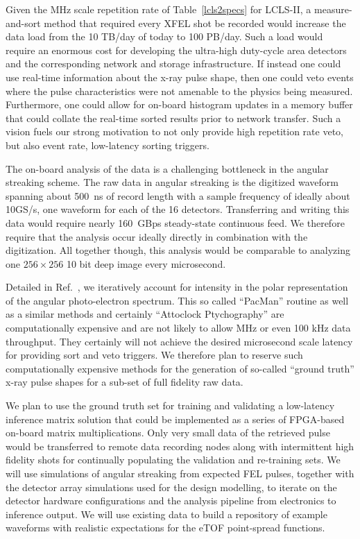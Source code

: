 Given the MHz scale repetition rate of Table~\ref{lcls2specs} for LCLS-II, a measure-and-sort method that required every XFEL shot be recorded would increase the data load from the 10 TB/day of today to 100 PB/day.
Such a load would require an enormous cost for developing the ultra-high duty-cycle area detectors and the corresponding network and storage infrastructure. 
If instead one could use real-time information about the x-ray pulse shape, then one could veto events where the pulse characteristics were not amenable to the physics being measured.
Furthermore, one could allow for on-board histogram updates in a memory buffer that could collate the real-time sorted results prior to network transfer.
Such a vision fuels our strong motivation to not only provide high repetition rate veto, but also event rate, low-latency sorting triggers.

The on-board analysis of the data is a challenging bottleneck in the angular streaking scheme.
The raw data in angular streaking is the digitized waveform spanning about 500~ns of record length with a sample frequency of ideally about 10GS/s, one waveform for each of the 16 detectors.
Transferring and writing this data would require nearly 160~GBps steady-state continuous feed.
We therefore require that the analysis occur ideally directly in combination with the digitization.
All together though, this analysis would be comparable to analyzing one $256\times256$ 10 bit deep image every microsecond.

Detailed in Ref.~\cite{Nick2018}, we iteratively account for intensity in the polar representation of the angular photo-electron spectrum.
This so called ``PacMan'' routine as well as a similar methods \cite{Thomas2015,Siqi2018,Worner2018} and certainly ``Attoclock Ptychography'' \cite{Feurer2018} are computationally expensive and are not likely to allow MHz or even 100 kHz data throughput.
They certainly will not achieve the desired microsecond scale latency for providing sort and veto triggers.
We therefore plan to reserve such computationally expensive methods for the generation of so-called ``ground truth'' x-ray pulse shapes for a sub-set of full fidelity raw data.

We plan to use the ground truth set for training and validating a low-latency inference matrix solution that could be implemented as a series of FPGA-based on-board matrix multiplications.
Only very small data of the retrieved pulse would be transferred to remote data recording nodes along with intermittent high fidelity shots for continually populating the validation and re-training sets.
We will use simulations of angular streaking from expected FEL pulses, together with the detector array simulations used for the design modelling, to iterate on the detector hardware configurations and the analysis pipeline from electronics to inference output.
We will use existing data to build a repository of example waveforms with realistic expectations for the eTOF point-spread functions.  

